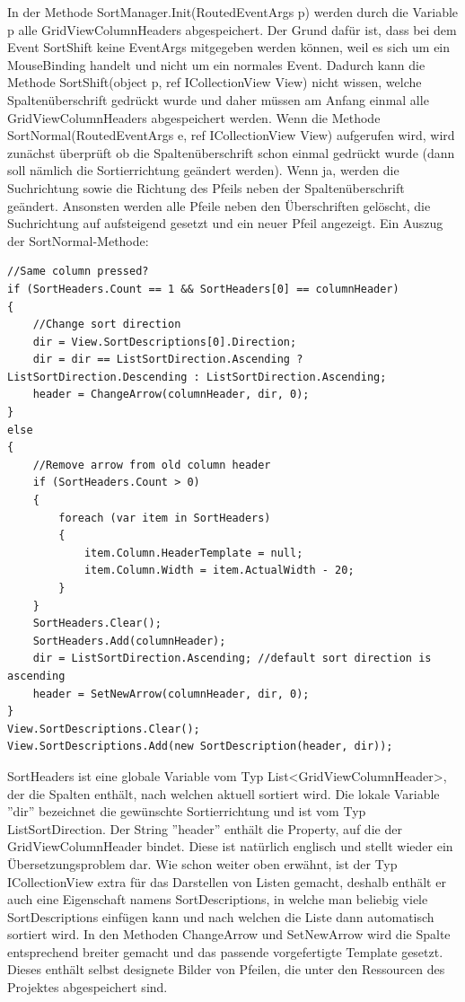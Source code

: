 In der Methode SortManager.Init(RoutedEventArgs p) werden durch die Variable p alle GridViewColumnHeaders abgespeichert. Der Grund dafür ist, dass bei dem Event SortShift keine EventArgs mitgegeben werden können, weil es sich um ein MouseBinding handelt und nicht um ein normales Event. Dadurch kann die Methode SortShift(object p, ref ICollectionView View) nicht wissen, welche Spaltenüberschrift gedrückt wurde und daher müssen am Anfang einmal alle GridViewColumnHeaders abgespeichert werden. \newline
Wenn die Methode SortNormal(RoutedEventArgs e, ref ICollectionView View) aufgerufen wird, wird zunächst überprüft ob die Spaltenüberschrift schon einmal gedrückt wurde (dann soll nämlich die Sortierrichtung geändert werden). Wenn ja, werden die Suchrichtung sowie die Richtung des Pfeils neben der Spaltenüberschrift geändert. Ansonsten werden alle Pfeile neben den Überschriften gelöscht, die Suchrichtung auf aufsteigend gesetzt und ein neuer Pfeil angezeigt. \newline Ein Auszug der SortNormal-Methode:
\begin{lstlisting}
//Same column pressed?
if (SortHeaders.Count == 1 && SortHeaders[0] == columnHeader)
{
	//Change sort direction
	dir = View.SortDescriptions[0].Direction;
	dir = dir == ListSortDirection.Ascending ? ListSortDirection.Descending : ListSortDirection.Ascending;
	header = ChangeArrow(columnHeader, dir, 0);
}
else
{
	//Remove arrow from old column header
	if (SortHeaders.Count > 0)
	{
		foreach (var item in SortHeaders)
		{
			item.Column.HeaderTemplate = null;
			item.Column.Width = item.ActualWidth - 20;
		}
	}
	SortHeaders.Clear();
	SortHeaders.Add(columnHeader);
	dir = ListSortDirection.Ascending; //default sort direction is ascending
	header = SetNewArrow(columnHeader, dir, 0);
}
View.SortDescriptions.Clear();
View.SortDescriptions.Add(new SortDescription(header, dir));
\end{lstlisting}
SortHeaders ist eine globale Variable vom Typ List\textless GridViewColumnHeader\textgreater , der die Spalten enthält, nach welchen aktuell sortiert wird. Die lokale Variable ''dir'' bezeichnet die gewünschte Sortierrichtung und ist vom Typ ListSortDirection. Der String ''header'' enthält die Property, auf die der GridViewColumnHeader bindet. Diese ist natürlich englisch und stellt wieder ein Übersetzungsproblem dar. \newline Wie schon weiter oben erwähnt, ist der Typ ICollectionView extra für das Darstellen von Listen gemacht, deshalb enthält er auch eine Eigenschaft namens SortDescriptions, in welche man beliebig viele SortDescriptions einfügen kann und nach welchen die Liste dann automatisch sortiert wird. In den Methoden ChangeArrow und SetNewArrow wird die Spalte entsprechend breiter gemacht und das passende vorgefertigte Template gesetzt. Dieses enthält selbst designete Bilder von Pfeilen, die unter den Ressourcen des Projektes abgespeichert sind.

